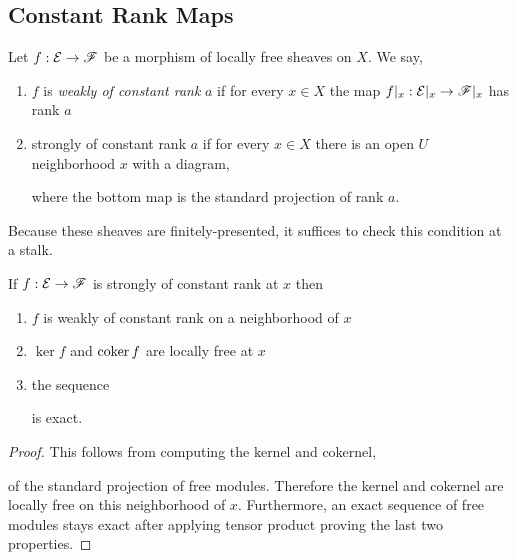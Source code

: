 \documentclass[12pt]{article}
\begin{document}
\subsection{Constant Rank Maps}



\begin{defn}
Let $f : \mathcal{E} \to \mathscr{F}$ be a morphism of locally free sheaves on $X$. We say,
\begin{enumerate}
\item $f$ is \textit{weakly of constant rank} $a$ if for every $x \in X$ the map $f|_x : \mathcal{E}|_x \to \mathscr{F}|_x$ has rank $a$
\item strongly of constant rank $a$ if for every $x \in X$ there is an open $U$ neighborhood $x$ with a diagram,
\begin{center}
\end{center}
where the bottom map is the standard projection of rank $a$.
\end{enumerate}
\end{defn}

\begin{rmk}
Because these sheaves are finitely-presented, it suffices to check this condition at a stalk.
\end{rmk}

\begin{lemma}
If $f : \mathcal{E} \to \mathscr{F}$ is strongly of constant rank at $x$ then
\begin{enumerate}
\item $f$ is weakly of constant rank on a neighborhood of $x$
\item $\ker{f}$ and $\operatorname{\mathrm{coker}}{f}$ are locally free at $x$
\item the sequence
\begin{center}
\end{center}
is exact.
\end{enumerate} 
\end{lemma}

\begin{proof}
This follows from computing the kernel and cokernel,
\begin{center}
\end{center}
of the standard projection of free modules. Therefore the kernel and cokernel are locally free on this neighborhood of $x$. Furthermore, an exact sequence of free modules stays exact after applying tensor product proving the last two properties.
\end{proof}
\end{document}
